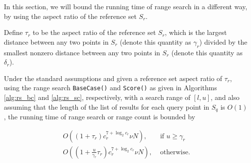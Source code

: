 In this section, we will bound the running time of range search in a different
way, by using the aspect ratio of the reference set $S_r$.

Define $\tau_r$ to be the aspect ratio of the reference set $S_r$, which is the
largest distance between any two points in $S_r$ (denote this quantity as
$\gamma_r$) divided by the smallest nonzero distance between any two points in
$S_r$ (denote this quantity as $\delta_r$).

\begin{thm}
Under the standard assumptions and given a reference set aspect ratio of
$\tau_r$, using the range search \texttt{BaseCase()} and \texttt{Score()} as
given in Algorithms \ref{alg:rs_bc} and \ref{alg:rs_sc}, respectively, with a
search range of $[l, u]$, and also assuming that the length of the list of
results for each query point in $S_q$ is $O(1)$, the running time of range
search or range count is bounded by

\begin{equation}
\begin{split}
  O((1 + \tau_r) c_r^{7 + \log_2 c_r} \nu N),& \text{\ \ \ \ if } u \ge \gamma_r\\
  O((1 + \frac{u}{\gamma_r} \tau_r) c_r^{7 + \log_2 c_r} \nu N),&
\text{\ \ \ \ otherwise}.
\end{split}
\end{equation}

\end{thm}

